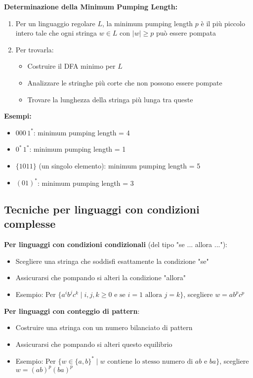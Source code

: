 \documentclass[12pt,a4paper]{article}
\begin{document}
\begin{risoluzione}
\textbf{Determinazione della Minimum Pumping Length:}
\begin{enumerate}
    \item Per un linguaggio regolare $L$, la minimum pumping length $p$ è il più piccolo intero tale che ogni stringa $w \in L$ con $|w| \geq p$ può essere pompata
    \item Per trovarla:
    \begin{itemize}
        \item Costruire il DFA minimo per $L$
        \item Analizzare le stringhe più corte che non possono essere pompate
        \item Trovare la lunghezza della stringa più lunga tra queste
    \end{itemize}
\end{enumerate}

\textbf{Esempi:}
\begin{itemize}
    \item $000\,1^*$: minimum pumping length = 4
    \item $0^*\,1^*$: minimum pumping length = 1
    \item $\{1011\}$ (un singolo elemento): minimum pumping length = 5
    \item $(01)^*$: minimum pumping length = 3
\end{itemize}
\end{risoluzione}

\subsection{Tecniche per linguaggi con condizioni complesse}

\begin{suggerimento}
\textbf{Per linguaggi con condizioni condizionali} (del tipo "se ... allora ..."):
\begin{itemize}
    \item Scegliere una stringa che soddisfi esattamente la condizione "se"
    \item Assicurarsi che pompando si alteri la condizione "allora"
    \item Esempio: Per $\{a^i b^j c^k \mid i,j,k \geq 0 \text{ e se } i=1 \text{ allora } j=k\}$, scegliere $w = ab^pc^p$
\end{itemize}
\end{suggerimento}

\begin{suggerimento}
\textbf{Per linguaggi con conteggio di pattern}:
\begin{itemize}
    \item Costruire una stringa con un numero bilanciato di pattern
    \item Assicurarsi che pompando si alteri questo equilibrio
    \item Esempio: Per $\{w \in \{a,b\}^* \mid w \text{ contiene lo stesso numero di } ab \text{ e } ba\}$, scegliere $w = (ab)^p(ba)^p$
\end{itemize}
\end{suggerimento}
\end{document}

